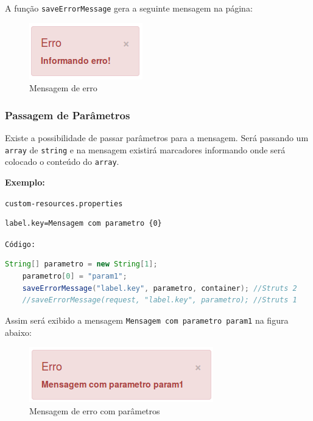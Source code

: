 A função \texttt{saveErrorMessage} gera a seguinte mensagem na página:

\begin{figure}[H]
	\centering
	\includegraphics[scale=0.75]{files/imgs/internacionalizacao-00.png}
	\caption{Mensagem de erro}
	\label{mensagem_erro}
\end{figure}

\subsubsection{Passagem de Parâmetros}

Existe a possibilidade de passar parâmetros para a mensagem. Será passando um
\texttt{array} de \texttt{string} e na mensagem existirá marcadores informando
onde será colocado o conteúdo do \texttt{array}.

\textbf{Exemplo:}

\texttt{custom-resources.properties}

\begin{lstlisting}[language=xml, frame=single, breaklines=true]
	label.key=Mensagem com parametro {0}
\end{lstlisting}

\texttt{Código:}

\begin{lstlisting}[language=java, frame=single, breaklines=true]
	String[] parametro = new String[1];
	parametro[0] = "param1";
	saveErrorMessage("label.key", parametro, container); //Struts 2
	//saveErrorMessage(request, "label.key", parametro); //Struts 1
\end{lstlisting}

Assim será exibido a mensagem \texttt{Mensagem com
parametro param1} na figura abaixo:

\begin{figure}[H]
	\centering
	\includegraphics[scale=0.75]{files/imgs/internacionalizacao-01.png}
	\caption{Mensagem de erro com parâmetros}
	\label{mensagem_erro_parametro}
\end{figure}

